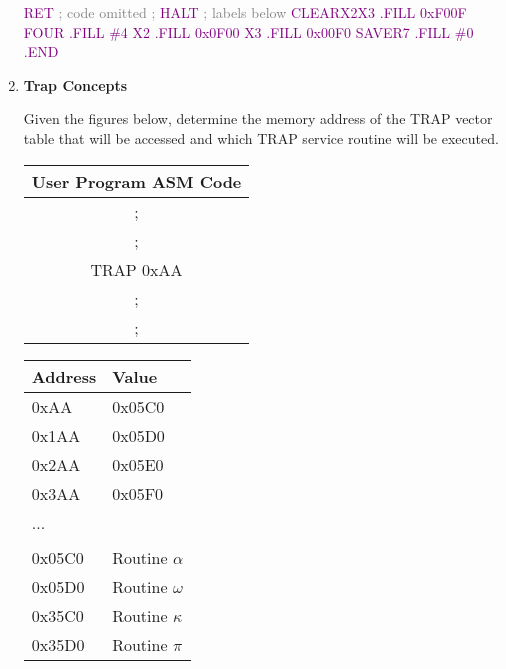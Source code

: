 \documentclass{article}
\begin{document}
\begin{enumerate}[label=(\alph*)]
    \textcolor{purple}{RET}
    \newline \textcolor{gray}{; code omitted}
    \newline    \textcolor{gray}{;}
    \newline \textcolor{purple}{HALT}
    \textcolor{gray}{; labels below}
    \newline
    \textcolor{purple}{CLEARX2X3 .FILL 0xF00F}
    \newline
    \textcolor{purple}{FOUR .FILL \#4}
    \newline
    \textcolor{purple}{X2 .FILL 0x0F00}
    \newline
    \textcolor{purple}{X3 .FILL 0x00F0}
    \newline
    \textcolor{purple}{SAVER7 .FILL \#0}
    \newline
    \textcolor{purple}{.END}
    
\item \textbf{Trap Concepts}

Given the figures below, determine the memory address of the TRAP vector table that will be accessed and which TRAP service routine will be executed.
\newline

\begin{center}

\begin{tabular}{||c  ||} 
\hline
\multicolumn{1}{|c|}{User Program ASM Code} \\
 \hline
 ;   \\ 
 \hline
;  \\ 
 \hline
 TRAP 0xAA \\
 \hline
 ;\\
 \hline
 ;  \\
 \hline
 
\end{tabular}

\begin{tabular}{|p{3cm} p{3cm} |} 
\hline
 Address & Value  \\ [0.5ex] 
 \hline\hline
 0xAA & 0x05C0 \\ 
 \hline
 0x1AA & 0x05D0 \\
 \hline
 0x2AA & 0x05E0 \\
 \hline
 0x3AA & 0x05F0 \\
 \hline
 ... &  \\ [1ex]
 \hline
  & \\ [1ex]
  \hline
  0x05C0 & Routine $\alpha$ \\
  \hline
  0x05D0 & Routine $\omega$\\
  \hline
  0x35C0 & Routine $\kappa$ \\
  \hline
  0x35D0 & Routine $\pi$ \\
 \hline
 

\end{tabular}
\end{center}
\end{enumerate}
\end{document}
